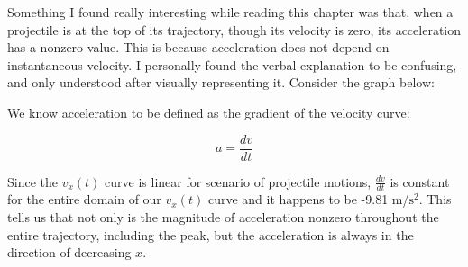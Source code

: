 Something I found really interesting while reading this chapter was that, when a projectile is at the top of its trajectory, though its velocity is zero, its acceleration has a nonzero value.
This is because acceleration does not depend on instantaneous velocity. I personally found the verbal explanation to be confusing, and only understood after visually representing it. Consider the graph below:

\begin{center}
\end{center}

We know acceleration to be defined as the gradient of the velocity curve:

\[
    a = \frac{dv}{dt}
\]

Since the $v_x (t)$ curve is linear for scenario of projectile motions, $\frac{dv}{dt}$ is constant for the entire domain of our $v_x (t)$ curve and it happens to be -9.81 m/$\text{s}^2$. This tells us that not only
is the magnitude of acceleration nonzero throughout the entire trajectory, including the peak, but the acceleration is always in the direction of decreasing $x$.